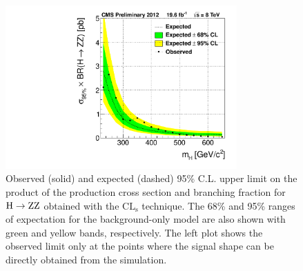 \begin{figure}[htbp]
 \begin{center}
 \centerline{
 \includegraphics[width=0.79\textwidth]{plots/xs_limit_observed_all-btag_ll.pdf}
}
\caption{
Observed (solid) and expected (dashed) 95\% C.L. upper limit on the product of the production cross section and branching fraction for $\mathrm{\mathrm{H}\rightarrow\mathrm{Z}\mathrm{Z}}$ obtained with the $\mathrm{CL_s}$ technique. The 68\% and 95\% ranges of expectation for the background-only model are also shown with green and yellow bands, respectively. The left plot shows the observed limit only at the points where the signal shape can be directly obtained from the simulation.
}
\label{fig:limitxs}
\end{center}
\end{figure}

%


